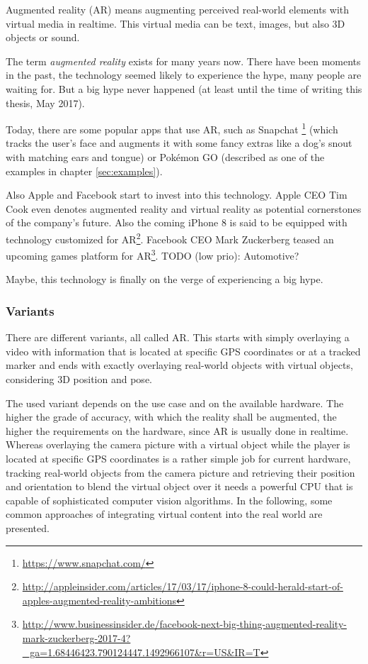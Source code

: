 Augmented reality (AR) means augmenting perceived real-world elements with virtual media in realtime. This virtual media can be text, images, but also 3D objects or sound.

The term \emph{augmented reality} exists for many years now. There have been moments in the past, the technology seemed likely to experience the hype, many people are waiting for. But a big hype never happened (at least until the time of writing this thesis, May 2017).

Today, there are some popular apps that use AR, such as Snapchat \footnote{\url{https://www.snapchat.com/}} (which tracks the user's face and augments it with some fancy extras like a dog's snout with matching ears and tongue) or Pok\'{e}mon GO (described as one of the examples in chapter \ref{sec:examples}).

Also Apple and Facebook start to invest into this technology. Apple CEO Tim Cook even denotes augmented reality and virtual reality as potential cornerstones of the company's future. Also the coming iPhone 8 is said to be equipped with technology customized for AR\footnote{\url{http://appleinsider.com/articles/17/03/17/iphone-8-could-herald-start-of-apples-augmented-reality-ambitions}}. Facebook CEO Mark Zuckerberg teased an upcoming games platform for AR\footnote{\url{http://www.businessinsider.de/facebook-next-big-thing-augmented-reality-mark-zuckerberg-2017-4?_ga=1.68446423.790124447.1492966107&r=US&IR=T}}. TODO (low prio): Automotive?

Maybe, this technology is finally on the verge of experiencing a big hype.

\subsubsection{Variants}
There are different variants, all called AR. This starts with simply overlaying a video with information that is located at specific GPS coordinates or at a tracked marker and ends with exactly overlaying real-world objects with virtual objects, considering 3D position and pose.

The used variant depends on the use case and on the available hardware. The higher the grade of accuracy, with which the reality shall be augmented, the higher the requirements on the hardware, since AR is usually done in realtime. Whereas overlaying the camera picture with a virtual object while the player is located at specific GPS coordinates is a rather simple job for current hardware, tracking real-world objects from the camera picture and retrieving their position and orientation to blend the virtual object over it needs a powerful CPU that is capable of sophisticated computer vision algorithms. In the following, some common approaches of integrating virtual content into the real world are presented.

